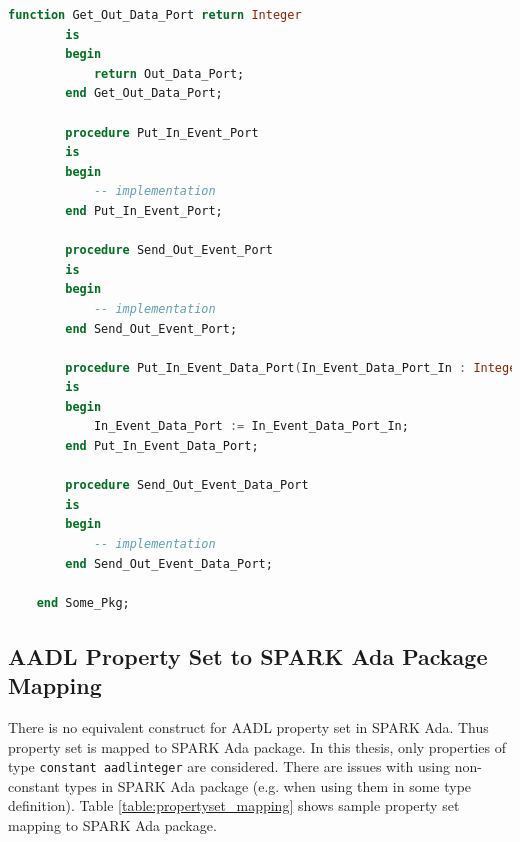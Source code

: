 \begin{lstlisting}[language=ada, frame=single, gobble=0, caption={Translation of sample AADL package from listing \ref{lst:aadl_sample}}, label={lst:package_mapping}]
	    function Get_Out_Data_Port return Integer
	    is
	    begin
	        return Out_Data_Port;
	    end Get_Out_Data_Port;

	    procedure Put_In_Event_Port
	    is
	    begin
	        -- implementation
	    end Put_In_Event_Port;

	    procedure Send_Out_Event_Port
	    is
	    begin
	        -- implementation
	    end Send_Out_Event_Port;

	    procedure Put_In_Event_Data_Port(In_Event_Data_Port_In : Integer)
	    is
	    begin
	        In_Event_Data_Port := In_Event_Data_Port_In;
	    end Put_In_Event_Data_Port;

	    procedure Send_Out_Event_Data_Port
	    is
	    begin
	        -- implementation
	    end Send_Out_Event_Data_Port;

	end Some_Pkg;
\end{lstlisting}
\doublespacing



\subsection{AADL Property Set to SPARK Ada Package Mapping}
\label{codegen:mapping:propertyset}

There is no equivalent construct for AADL property set in SPARK Ada. Thus property set is mapped to SPARK Ada package. In this thesis, only properties of type \lstinline{constant aadlinteger} are considered. There are issues with using non-constant types in SPARK Ada package (e.g. when using them in some type definition). Table \ref{table:propertyset_mapping} shows sample property set mapping to SPARK Ada package.

